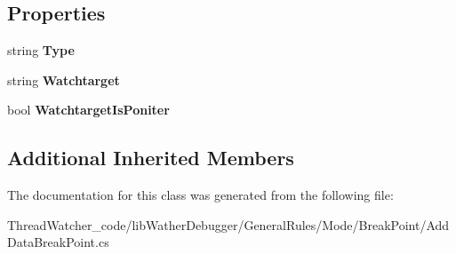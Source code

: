 \subsection*{Properties}
\begin{DoxyCompactItemize}
\item 
\hypertarget{class_watcher_1_1_debugger_1_1_general_rules_1_1_mode_1_1_break_point_1_1_add_data_break_point_ad1973dc94ab2a768366afdf48eeb7952}{string {\bfseries Type}}\label{class_watcher_1_1_debugger_1_1_general_rules_1_1_mode_1_1_break_point_1_1_add_data_break_point_ad1973dc94ab2a768366afdf48eeb7952}

\item 
\hypertarget{class_watcher_1_1_debugger_1_1_general_rules_1_1_mode_1_1_break_point_1_1_add_data_break_point_a30a75dc21c539291bcac382bba2d7789}{string {\bfseries Watchtarget}}\label{class_watcher_1_1_debugger_1_1_general_rules_1_1_mode_1_1_break_point_1_1_add_data_break_point_a30a75dc21c539291bcac382bba2d7789}

\item 
\hypertarget{class_watcher_1_1_debugger_1_1_general_rules_1_1_mode_1_1_break_point_1_1_add_data_break_point_ab1eea614caf575271eded164f516e682}{bool {\bfseries Watchtarget\+Is\+Poniter}}\label{class_watcher_1_1_debugger_1_1_general_rules_1_1_mode_1_1_break_point_1_1_add_data_break_point_ab1eea614caf575271eded164f516e682}

\end{DoxyCompactItemize}
\subsection*{Additional Inherited Members}


The documentation for this class was generated from the following file\+:\begin{DoxyCompactItemize}
\item 
Thread\+Watcher\+\_\+code/lib\+Wather\+Debugger/\+General\+Rules/\+Mode/\+Break\+Point/Add\+Data\+Break\+Point.\+cs\end{DoxyCompactItemize}
